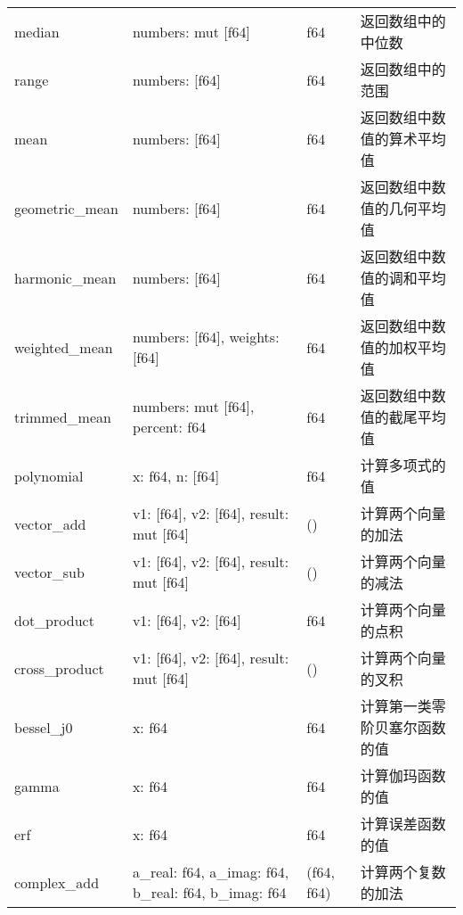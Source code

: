 \begin{longtable}[c]{@{}llll@{}}
    median             & numbers: mut [f64]                                     & f64         & 返回数组中的中位数      \\
    range              & numbers: [f64]                                         & f64         & 返回数组中的范围       \\
    mean               & numbers: [f64]                                         & f64         & 返回数组中数值的算术平均值  \\
    geometric\_mean    & numbers: [f64]                                         & f64         & 返回数组中数值的几何平均值  \\
    harmonic\_mean     & numbers: [f64]                                         & f64         & 返回数组中数值的调和平均值  \\
    weighted\_mean     & numbers: [f64], weights: [f64]                         & f64         & 返回数组中数值的加权平均值  \\
    trimmed\_mean      & numbers: mut [f64], percent: f64                       & f64         & 返回数组中数值的截尾平均值  \\
    polynomial         & x: f64, n: [f64]                                       & f64         & 计算多项式的值        \\
    vector\_add        & v1: [f64], v2: [f64], result: mut [f64]                & ()          & 计算两个向量的加法      \\
    vector\_sub        & v1: [f64], v2: [f64], result: mut [f64]                & ()          & 计算两个向量的减法      \\
    dot\_product       & v1: [f64], v2: [f64]                                   & f64         & 计算两个向量的点积      \\
    cross\_product     & v1: [f64], v2: [f64], result: mut [f64]                & ()          & 计算两个向量的叉积      \\
    bessel\_j0         & x: f64                                                 & f64         & 计算第一类零阶贝塞尔函数的值 \\
    gamma              & x: f64                                                 & f64         & 计算伽玛函数的值       \\
    erf                & x: f64                                                 & f64         & 计算误差函数的值       \\
    complex\_add       & a\_real: f64, a\_imag: f64, b\_real: f64, b\_imag: f64 & (f64, f64)  & 计算两个复数的加法      \\

\end{longtable}
